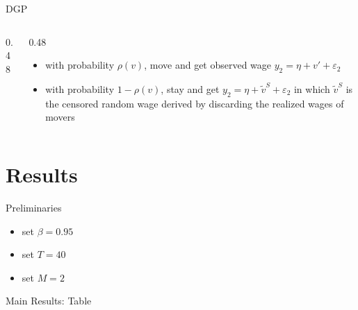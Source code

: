 \documentclass[aspectratio=169,professionalfonts]{beamer}
\begin{document}
\begin{frame}{DGP}
  \begin{columns}[T,onlytextwidth]
    \begin{column}{0.48\linewidth}
    \end{column}
    \begin{column}{0.48\linewidth}
      \begin{itemize}
        \item with probability $\rho(v)$, move and get observed wage $y_2 = \eta + v' + \varepsilon_2$
        \item with probability $1-\rho(v)$, stay and get $y_2 = \eta + \tilde{v}^S + \varepsilon_2$ in which $\tilde{v}^S$ is the censored random wage derived by discarding the realized wages of movers
      \end{itemize}
    \end{column}
  \end{columns}
\end{frame}

\section{Results}

\begin{frame}{Preliminaries}
  \begin{itemize}
    \item set $\beta = 0.95$
    \item set $T = 40$
    \item set $M = 2$
  \end{itemize}
\end{frame}

\begin{frame}{Main Results: Table}
    \centering
\end{frame}
\end{document}
